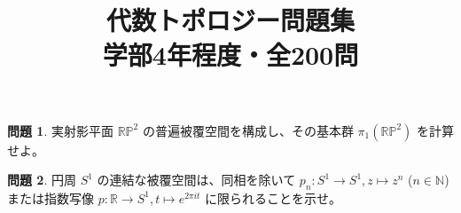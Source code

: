 \documentclass[uplatex, dvipdfmx, 11pt]{jsbook}
\numberwithin{equation}{chapter}
\theoremstyle{definition}
\newtheorem{problem}{問題}[chapter]       %
\begin{document}
\begin{problem}
実射影平面 $\mathbb{RP}^2$ の普遍被覆空間を構成し、その基本群 $\pi_1(\mathbb{RP}^2)$ を計算せよ。
\end{problem}

\begin{problem}
円周 $S^1$ の連結な被覆空間は、同相を除いて $p_n: S^1 \to S^1, z \mapsto z^n$ ($n \in \mathbb{N}$) または指数写像 $p: \mathbb{R} \to S^1, t \mapsto e^{2\pi i t}$ に限られることを示せ。
\end{problem}

\clearpage
\fi

\title{
  代数トポロジー問題集\\
  \large 学部4年程度・全200問
}
\author{}
\date{}
\end{document}
